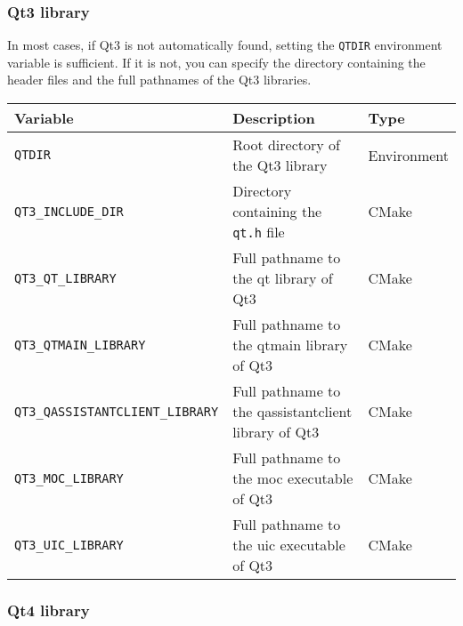 \subsubsection{Qt3 library}

In most cases, if Qt3 is not automatically found, setting the \texttt{QTDIR} 
environment variable is sufficient. If it is not, you can specify the directory containing 
the header files and the full pathnames of the Qt3 libraries.

{\ccTexHtml{\small}{}
\renewcommand{\arraystretch}{1.3}
\gdef\lcTabularBorder{2}
\begin{tabular}{|l|l|l|} \hline
  \textbf{Variable}                       & \textbf{Description}                                  & \textbf{Type}\\\hline\hline
  \texttt{QTDIR}                          & Root directory of the Qt3 library                     & Environment\\\hline
  \texttt{QT3\_INCLUDE\_DIR}              & Directory containing the \texttt{qt.h} file           & CMake\\\hline
  \texttt{QT3\_QT\_LIBRARY}               & Full pathname to the qt library of Qt3                & CMake\\\hline
  \texttt{QT3\_QTMAIN\_LIBRARY}           & Full pathname to the qtmain library of Qt3            & CMake\\\hline
  \texttt{QT3\_QASSISTANTCLIENT\_LIBRARY} & Full pathname to the qassistantclient library of Qt3  & CMake\\\hline
  \texttt{QT3\_MOC\_LIBRARY}              & Full pathname to the moc executable of Qt3             & CMake\\\hline
  \texttt{QT3\_UIC\_LIBRARY}              & Full pathname to the uic executable of Qt3             & CMake\\\hline
\end{tabular}
}

\subsubsection{Qt4 library}

